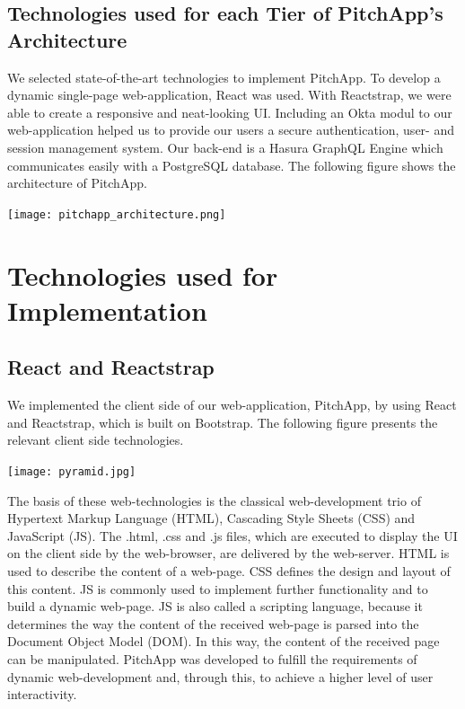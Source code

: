 \break

\section{Technologies used for each Tier of PitchApp's Architecture}

We selected state-of-the-art technologies to implement PitchApp. To develop a dynamic single-page web-application, React was used. With Reactstrap, we were able to create a responsive and neat-looking UI. Including an Okta modul to our web-application helped us to provide our users a secure authentication, user- and session management system. Our back-end is a Hasura GraphQL Engine which communicates easily with a PostgreSQL database. The following figure shows the architecture of PitchApp.

\begin{center}
	\texttt{[image: pitchapp\_architecture.png]}
\end{center}


\chapter{Technologies used for Implementation}
\section{React and Reactstrap}

We implemented the client side of our web-application, PitchApp, by using React and Reactstrap, which is built on Bootstrap. The following figure presents the relevant client side technologies.

\begin{center}
	\texttt{[image: pyramid.jpg]}
\end{center}  

The basis of these web-technologies is the classical web-development trio of Hypertext Markup Language (HTML), Cascading Style Sheets (CSS) and JavaScript (JS). The .html, .css and .js files, which are executed to display the UI on the client side by the web-browser, are delivered by the web-server. HTML is used to describe the content of a web-page. CSS defines the design and layout of this content. JS is commonly used to implement further functionality and to build a dynamic web-page. JS is also called a scripting language, because it determines the way the content of the received web-page is parsed into the Document Object Model (DOM). In this way, the content of the received page can be manipulated. PitchApp was developed to fulfill the requirements of dynamic web-development and, through this, to achieve a higher level of user interactivity.

